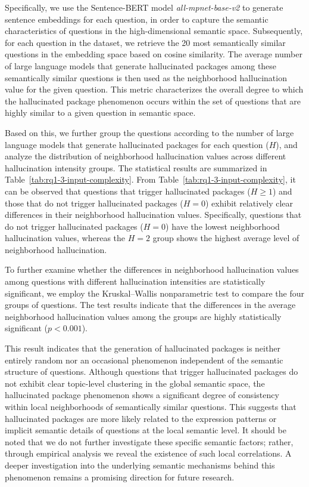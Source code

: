 Specifically, we use the Sentence-BERT model \textit{all-mpnet-base-v2} to generate sentence embeddings for each question, in order to capture the semantic 
characteristics of questions in the high-dimensional semantic space. Subsequently, for each question in the dataset, we retrieve the 20 most semantically 
similar questions in the embedding space based on cosine similarity. The average number of large language models that generate hallucinated packages among these 
semantically similar questions is then used as the neighborhood hallucination value for the given question. This metric characterizes the overall degree to 
which the hallucinated package phenomenon occurs within the set of questions that are highly similar to a given question in semantic space.

Based on this, we further group the questions according to the number of large language models that generate hallucinated packages for each question ($H$), 
and analyze the distribution of neighborhood hallucination values across different hallucination intensity groups. The statistical results are summarized in 
Table~\ref{tab:rq1-3-input-complexity}. From Table~\ref{tab:rq1-3-input-complexity}, it can be observed that questions that trigger hallucinated 
packages ($H \geq 1$) and those that do not trigger hallucinated packages ($H = 0$) exhibit relatively clear differences in their neighborhood hallucination 
values. Specifically, questions that do not trigger hallucinated packages ($H = 0$) have the lowest neighborhood hallucination values, whereas the $H = 2$ group 
shows the highest average level of neighborhood hallucination.

To further examine whether the differences in neighborhood hallucination values among questions with different hallucination intensities are statistically 
significant, we employ the Kruskal--Wallis nonparametric test to compare the four groups of questions. The test results indicate that the differences in the 
average neighborhood hallucination values among the groups are highly statistically significant ($p < 0.001$).

This result indicates that the generation of hallucinated packages is neither entirely random nor an occasional phenomenon independent of the semantic structure 
of questions. Although questions that trigger hallucinated packages do not exhibit clear topic-level clustering in the global semantic space, the hallucinated 
package phenomenon shows a significant degree of consistency within local neighborhoods of semantically similar questions. This suggests that hallucinated 
packages are more likely related to the expression patterns or implicit semantic details of questions at the local semantic level. It should be noted that 
we do not further investigate these specific semantic factors; rather, through empirical analysis we reveal the existence of such local correlations. 
A deeper investigation into the underlying semantic mechanisms behind this phenomenon remains a promising direction for future research.